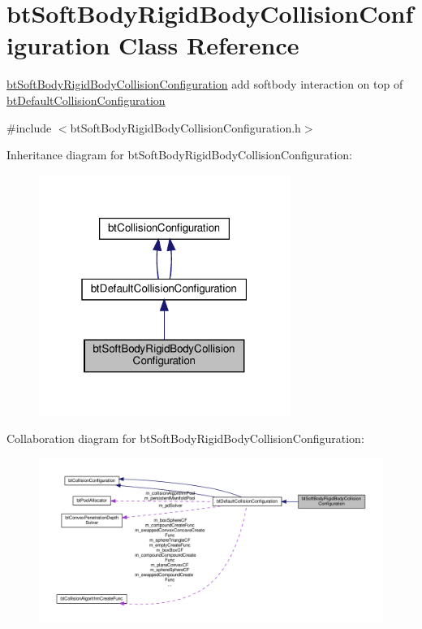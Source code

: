\hypertarget{classbtSoftBodyRigidBodyCollisionConfiguration}{}\section{bt\+Soft\+Body\+Rigid\+Body\+Collision\+Configuration Class Reference}
\label{classbtSoftBodyRigidBodyCollisionConfiguration}


\hyperlink{classbtSoftBodyRigidBodyCollisionConfiguration}{bt\+Soft\+Body\+Rigid\+Body\+Collision\+Configuration} add softbody interaction on top of \hyperlink{classbtDefaultCollisionConfiguration}{bt\+Default\+Collision\+Configuration}  




{\ttfamily \#include $<$bt\+Soft\+Body\+Rigid\+Body\+Collision\+Configuration.\+h$>$}



Inheritance diagram for bt\+Soft\+Body\+Rigid\+Body\+Collision\+Configuration\+:
\nopagebreak
\begin{figure}[H]
\begin{center}
\leavevmode
\includegraphics[width=232pt]{classbtSoftBodyRigidBodyCollisionConfiguration__inherit__graph}
\end{center}
\end{figure}


Collaboration diagram for bt\+Soft\+Body\+Rigid\+Body\+Collision\+Configuration\+:
\nopagebreak
\begin{figure}[H]
\begin{center}
\leavevmode
\includegraphics[width=350pt]{classbtSoftBodyRigidBodyCollisionConfiguration__coll__graph}
\end{center}
\end{figure}

